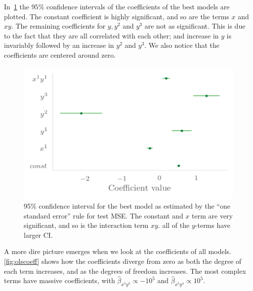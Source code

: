 In~\cref{fig:olsci} the \(95\%\) confidence intervals of the coefficients of the
best models are plotted. The constant coefficient is highly significant, and so
are the terms \(x\) and \(xy\). The remaining coefficients for \(y, y^{2}\) and
\(y^{3}\) are not as significant. This is due to the fact that they are all
correlated with each other; and increase in \(y\) is invariably followed by an
increase in \(y^{2}\) and \(y^{3}\). We also notice that the coefficients are
centered around zero.
\begin{figure}[]
  \centering
  \includegraphics[]{figures/ols_ci.png}
  \caption{\label{fig:olsci} 95\% confidence interval for the best model as
    estimated by the ``one standard error'' rule for test MSE. The constant and
    \(x\) term are very significant, and so is the interaction term \(xy\). all
    of the \(y\)-terms have larger CI.}
\end{figure}

A more dire picture emerges when we look at the coefficients of all models.
\cref{fig:olscoeff} shows how the coefficients diverge from zero as both the
degree of each term increases, and as the degrees of freedom increases. The most
complex terms have massive coefficients, with \(\hat\beta_{x^{5}y^{5}} \propto
-10^{5}\) and \(\hat\beta_{x^{5}y^{4}}\propto 10^{5}\).

